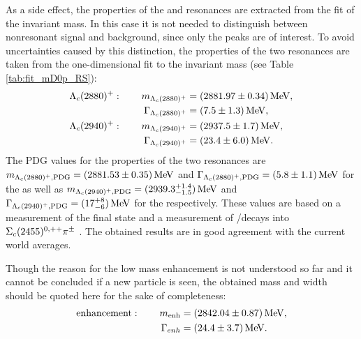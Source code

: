 As a side effect, the properties of the \LcResI and \LcResII resonances are extracted from the fit of the invariant \Dz\proton mass.
In this case it is not needed to distinguish between nonresonant signal and background, since only the peaks are of interest. 
To avoid uncertainties caused by this distinction, the properties of the two resonances are taken from the one-dimensional fit to the invariant \Dz\proton mass (see Table \ref{tab:fit_mD0p_RS}):
\begin{align*}
    {\ensuremath{\Lambda}}_{c}(2880)^+: \qquad  m_{{\Lambda}_{c}(2880)^+}       &= (2881.97 \pm 0.34) \mathrm{\,Me\kern -0.1em V}, \\
                     \Gamma_{{\Lambda}_{c}(2880)^+}  &= (7.5 \pm 1.3) \mathrm{\,Me\kern -0.1em V}, \\
    {\Lambda}_{c}(2940)^+: \qquad m_{{\Lambda}_{c}(2940)^+}      &= (2937.5 \pm 1.7) \mathrm{\,Me\kern -0.1em V}, \\
                     \Gamma_{{\Lambda}_{c}(2940)^+} &= (23.4 \pm 6.0) \mathrm{\,Me\kern -0.1em V}.
\end{align*}
The PDG values for the properties of the two resonances are $m_{{\Lambda}_{c}(2880)^+, \text{PDG}} = (2881.53 \pm 0.35)\mathrm{\,Me\kern -0.1em V}$ and $\Gamma_{{\Lambda}_{c}(2880)^+, \text{PDG}} = (5.8 \pm 1.1)\mathrm{\,Me\kern -0.1em V}$ for the \LcResI as well as $m_{{\Lambda}_{c}(2940)^+, \text{PDG}} = (2939.3^{+1.4}_{-1.5})\mathrm{\,Me\kern -0.1em V}$ and $\Gamma_{{\Lambda}_{c}(2940)^+, \text{PDG}} = (17^{+8}_{-6})\mathrm{\,Me\kern -0.1em V}$ for the \LcResII respectively.
These values are based on a \babar measurement of the \Dz\proton final state and a \belle measurement of \LcResI/\LcResII decays into $\Sigma_{c}(2455)^{0,++}{{\pi}^\pm}$ \cite{Belle_LcRes}.
The obtained results are in good agreement with the current world averages.

Though the reason for the low mass enhancement is not understood so far and it cannot be concluded if a new particle is seen, the obtained mass and width should be quoted here for the sake of completeness:
\begin{align*}
    \text{enhancement}: \qquad  m_{\text{enh}} &= (2842.04 \pm 0.87) \mathrm{\,Me\kern -0.1em V}, \\
                                \Gamma_{enh}   &= (24.4 \pm 3.7) \mathrm{\,Me\kern -0.1em V}. \\
\end{align*}
